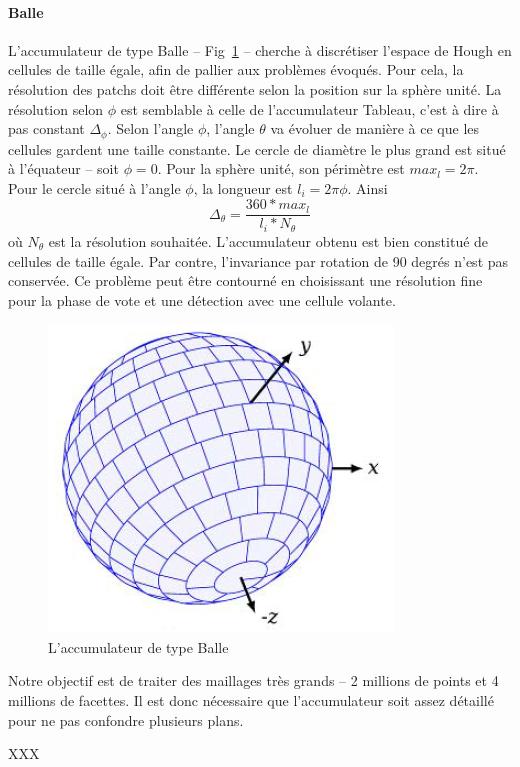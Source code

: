 \documentclass[12pt, twoside]{article}
\begin{document}
\paragraph{Balle}
L’accumulateur de type Balle -- Fig~\ref{fig:Ball} -- cherche à discrétiser l’espace de Hough en cellules de taille égale, afin de pallier aux problèmes évoqués. Pour cela, la résolution des patchs doit être différente selon la position sur la sphère unité. La résolution selon $\phi$ est semblable à celle de l’accumulateur Tableau, c’est à dire à pas constant $\Delta_{\phi}$. Selon l’angle $\phi$, l’angle $\theta$ va évoluer de manière à ce que les cellules gardent une taille constante. Le cercle de diamètre le plus grand est situé à l’équateur -- soit $\phi = 0$. Pour la sphère unité, son périmètre est $max_l = 2\pi$. Pour le cercle situé à l’angle $\phi$, la longueur est $l_i = 2\pi \phi$. Ainsi
$$\Delta_{\theta} = \dfrac{360*max_l}{l_i*N_{\theta}}$$
où $N_{\theta}$ est la résolution souhaitée. L’accumulateur obtenu est bien constitué de cellules de taille égale. Par contre, l’invariance par rotation de 90 degrés n’est pas conservée. Ce problème peut être contourné en choisissant une résolution fine pour la phase de vote et une détection avec une cellule volante.

\begin{figure}[h]
\centering
\includegraphics[scale=0.65]{Ball.png}
\caption{\label{fig:Ball} L'accumulateur de type Balle}
\end{figure}

Notre objectif est de traiter des maillages très grands -- 2 millions de points et 4 millions de facettes. Il est donc nécessaire que l'accumulateur soit assez détaillé pour ne pas confondre plusieurs plans.

XXX
\end{document}
